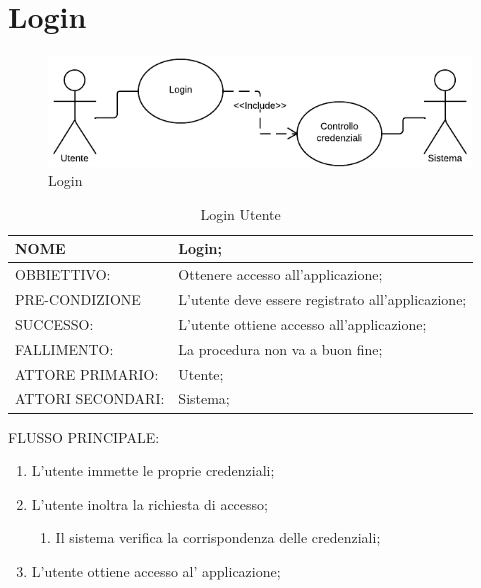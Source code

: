 \section{Login}
\begin{figure}[h!]
\centering
\includegraphics[scale=0.50]{img/use/Log.png}
\caption{Login}
\label{fig:Login}
\end{figure}
\begin{table}[H]
\begin{tabular}{p{}|p{}}
\toprule
NOME & Login;\\
\hline
OBBIETTIVO: & Ottenere accesso all'applicazione;\\
\hline
PRE-CONDIZIONE & L'utente deve essere registrato all'applicazione;\\
\hline
SUCCESSO: & L'utente ottiene accesso all'applicazione;\\
\hline
FALLIMENTO: & La procedura non va a buon fine;\\
\hline
ATTORE PRIMARIO: & Utente;\\
\hline
ATTORI SECONDARI: & Sistema;\\
\bottomrule
\end{tabular}
\caption{Login Utente}
\label{table:log}
\end{table}
FLUSSO PRINCIPALE:
\begin{enumerate}
\item L'utente immette le proprie credenziali;
\item L'utente inoltra la richiesta di accesso;
\begin{enumerate}
\item Il sistema verifica la corrispondenza delle credenziali;
\end{enumerate}
\item L'utente ottiene accesso al' applicazione;
\end{enumerate}

